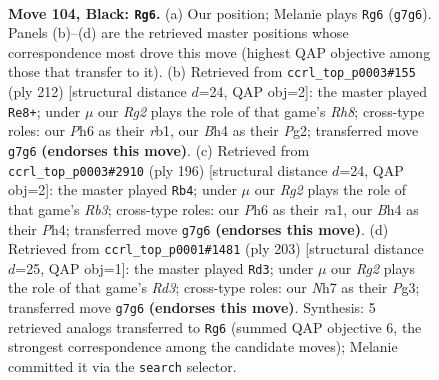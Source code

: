 \documentclass[11pt]{article}
\begin{document}
\clearpage

\begin{figure}[p]\centering
\begin{subfigure}{0.46\textwidth}\centering
\resizebox{\linewidth}{!}{%
\newchessgame
\chessboard[
  setfen={R7/6rn/7p/4p3/6kb/1K1p4/8/8 b - - 5 104},
  showmover=false,
  pgfstyle=straightmove, color=movearrow, markmove={g7-g6}
]}
\caption{}
\end{subfigure}\hfill
\begin{subfigure}{0.46\textwidth}\centering
\resizebox{\linewidth}{!}{%
\newchessgame
\chessboard[
  setfen={7R/8/4k3/8/5p2/5P2/6PK/1r6 w - - 21 107},
  showmover=false,
  pgfstyle=straightmove, color=movearrow, markmove={h8-e8}
]}
\caption{}
\end{subfigure}
\\[4pt]
\begin{subfigure}{0.46\textwidth}\centering
\resizebox{\linewidth}{!}{%
\newchessgame
\chessboard[
  setfen={5k2/8/6p1/6P1/7P/1R5K/8/r7 w - - 9 99},
  showmover=false,
  pgfstyle=straightmove, color=movearrow, markmove={b3-b4}
]}
\caption{}
\end{subfigure}\hfill
\begin{subfigure}{0.46\textwidth}\centering
\resizebox{\linewidth}{!}{%
\newchessgame
\chessboard[
  setfen={8/3k2K1/3r4/8/7P/6p1/8/5R2 b - - 11 102},
  showmover=false,
  pgfstyle=straightmove, color=movearrow, markmove={d6-d3}
]}
\caption{}
\end{subfigure}
\caption{\textbf{Move 104, Black: \texttt{Rg6}.} (a) Our position; Melanie plays \texttt{Rg6} (\texttt{g7g6}). Panels (b)--(d) are the retrieved master positions whose correspondence most drove this move (highest QAP objective among those that transfer to it). (b) Retrieved from \texttt{ccrl\_top\_p0003\#155} (ply 212) [structural distance $d$=24, QAP obj=2]: the master played \texttt{Re8+}; under $\mu$ our \emph{Rg2} plays the role of that game's \emph{Rh8}; cross-type roles: our \emph{P}h6 as their \emph{r}b1, our \emph{B}h4 as their \emph{P}g2; transferred move \texttt{g7g6} \textbf{(endorses this move)}. (c) Retrieved from \texttt{ccrl\_top\_p0003\#2910} (ply 196) [structural distance $d$=24, QAP obj=2]: the master played \texttt{Rb4}; under $\mu$ our \emph{Rg2} plays the role of that game's \emph{Rb3}; cross-type roles: our \emph{P}h6 as their \emph{r}a1, our \emph{B}h4 as their \emph{P}h4; transferred move \texttt{g7g6} \textbf{(endorses this move)}. (d) Retrieved from \texttt{ccrl\_top\_p0001\#1481} (ply 203) [structural distance $d$=25, QAP obj=1]: the master played \texttt{Rd3}; under $\mu$ our \emph{Rg2} plays the role of that game's \emph{Rd3}; cross-type roles: our \emph{N}h7 as their \emph{P}g3; transferred move \texttt{g7g6} \textbf{(endorses this move)}. Synthesis: 5 retrieved analogs transferred to \texttt{Rg6} (summed QAP objective 6, the strongest correspondence among the candidate moves); Melanie committed it via the \texttt{search} selector.}
\label{fig:thought-m207}
\end{figure}
\end{document}
